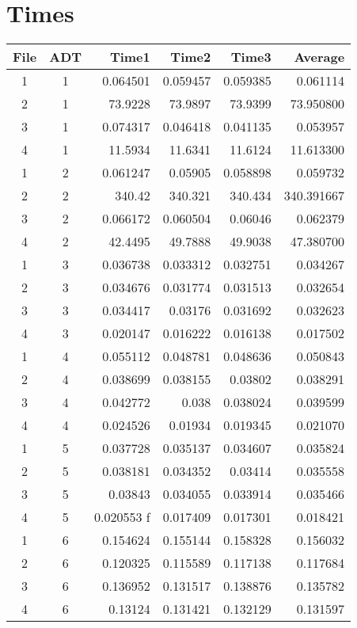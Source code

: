 \documentclass[12pt]{article}
\begin{document}
\section{Times}
\begin{center}
    \begin{tabular}{c c r r r r}
        File & ADT & Time1      & Time2    & Time3    & Average    \\

        \hline %
        1    & 1   & 0.064501   & 0.059457 & 0.059385 & 0.061114   \\
        2    & 1   & 73.9228    & 73.9897  & 73.9399  & 73.950800  \\
        3    & 1   & 0.074317   & 0.046418 & 0.041135 & 0.053957   \\
        4    & 1   & 11.5934    & 11.6341  & 11.6124  & 11.613300  \\
        \hline %
        1    & 2   & 0.061247   & 0.05905  & 0.058898 & 0.059732   \\
        2    & 2   & 340.42     & 340.321  & 340.434  & 340.391667 \\
        3    & 2   & 0.066172   & 0.060504 & 0.06046  & 0.062379   \\
        4    & 2   & 42.4495    & 49.7888  & 49.9038  & 47.380700  \\
        \hline %
        1    & 3   & 0.036738   & 0.033312 & 0.032751 & 0.034267   \\
        2    & 3   & 0.034676   & 0.031774 & 0.031513 & 0.032654   \\
        3    & 3   & 0.034417   & 0.03176  & 0.031692 & 0.032623   \\
        4    & 3   & 0.020147   & 0.016222 & 0.016138 & 0.017502   \\
        \hline %
        1    & 4   & 0.055112   & 0.048781 & 0.048636 & 0.050843   \\
        2    & 4   & 0.038699   & 0.038155 & 0.03802  & 0.038291   \\
        3    & 4   & 0.042772   & 0.038    & 0.038024 & 0.039599   \\
        4    & 4   & 0.024526   & 0.01934  & 0.019345 & 0.021070   \\
        \hline %
        1    & 5   & 0.037728   & 0.035137 & 0.034607 & 0.035824   \\
        2    & 5   & 0.038181   & 0.034352 & 0.03414  & 0.035558   \\
        3    & 5   & 0.03843    & 0.034055 & 0.033914 & 0.035466   \\
        4    & 5   & 0.020553 f & 0.017409 & 0.017301 & 0.018421   \\
        \hline %
        1    & 6   & 0.154624   & 0.155144 & 0.158328 & 0.156032   \\
        2    & 6   & 0.120325   & 0.115589 & 0.117138 & 0.117684   \\
        3    & 6   & 0.136952   & 0.131517 & 0.138876 & 0.135782   \\
        4    & 6   & 0.13124    & 0.131421 & 0.132129 & 0.131597
    \end{tabular}
\end{center}
\end{document}
